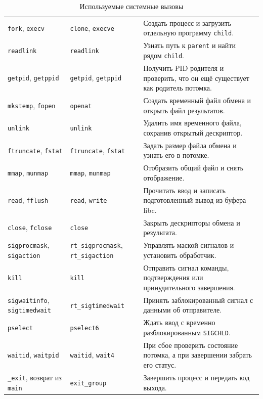 \documentclass[12pt,a4paper]{article}
\begin{document}
\begin{table}[H]
\small
\caption{Используемые системные вызовы}
\begin{tabularx}{\linewidth}{|P{4.1cm}|P{3.6cm}|L|}
\hline
{} &  &  \\ \hline
\texttt{fork}, \texttt{execv} & \texttt{clone}, \texttt{execve} & Создать процесс и загрузить отдельную программу \texttt{child}. \\ \hline
\texttt{readlink} & \texttt{readlink} & Узнать путь к \texttt{parent} и найти рядом \texttt{child}. \\ \hline
\texttt{getpid}, \texttt{getppid} & \texttt{getpid}, \texttt{getppid} & Получить PID родителя и проверить, что он ещё существует как родитель потомка. \\ \hline
\texttt{mkstemp}, \texttt{fopen} & \texttt{openat} & Создать временный файл обмена и открыть файл результатов. \\ \hline
\texttt{unlink} & \texttt{unlink} & Удалить имя временного файла, сохранив открытый дескриптор. \\ \hline
\texttt{ftruncate}, \texttt{fstat} & \texttt{ftruncate}, \texttt{fstat} & Задать размер файла обмена и узнать его в потомке. \\ \hline
\texttt{mmap}, \texttt{munmap} & \texttt{mmap}, \texttt{munmap} & Отобразить общий файл и снять отображение. \\ \hline
\texttt{read}, \texttt{fflush} & \texttt{read}, \texttt{write} & Прочитать ввод и записать подготовленный вывод из буфера libc. \\ \hline
\texttt{close}, \texttt{fclose} & \texttt{close} & Закрыть дескрипторы обмена и результата. \\ \hline
\texttt{sigprocmask}, \texttt{sigaction} & \texttt{rt\_sigprocmask}, \texttt{rt\_sigaction} & Управлять маской сигналов и установить обработчик. \\ \hline
\texttt{kill} & \texttt{kill} & Отправить сигнал команды, подтверждения или принудительного завершения. \\ \hline
\texttt{sigwaitinfo}, \texttt{sigtimedwait} & \texttt{rt\_sigtimedwait} & Принять заблокированный сигнал с данными об отправителе. \\ \hline
\texttt{pselect} & \texttt{pselect6} & Ждать ввод с временно разблокированным \texttt{SIGCHLD}. \\ \hline
\texttt{waitid}, \texttt{waitpid} & \texttt{waitid}, \texttt{wait4} & При сбое проверить состояние потомка, а при завершении забрать его статус. \\ \hline
\texttt{\_exit}, возврат из \texttt{main} & \texttt{exit\_group} & Завершить процесс и передать код выхода. \\ \hline
\end{tabularx}
\end{table}
\end{document}
